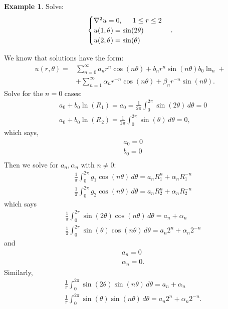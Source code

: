 \documentclass{book}
\theoremstyle{definition}
\newtheorem{exmp}{Example}[section]
\newcommand{\f}[2]{\frac{#1}{#2}}
\begin{document}
\begin{exmp}
	Solve:
	\begin{align*}
	\begin{cases}
	\laplacian u = 0, \hspace{0.5cm} 1\leq r\leq 2\\
	u(1,\theta) = \sin(2\theta)\\
	u(2,\theta) = \sin(\theta)
	\end{cases}.
	\end{align*}
	
	We know that solutions have the form:
	\begin{align*}
	u(r,\theta) =& \sum^\infty_{n=0} a_n r^n \cos(n\theta) + b_n r^{n}\sin(n\theta) b_0\ln_n +\\
	&+\sum^\infty_{n=1}\alpha_n r^{-n}\cos(n\theta) + \beta_n r^{-n}\sin(n\theta). 
	\end{align*}
	Solve for the $n=0$ cases:
	\begin{align*}
	&a_0 + b_0 \ln(R_1) = a_0 = \f{1}{2\pi}\int^{2\pi}_0 \sin(2\theta)\,d\theta = 0\\
	&a_0 + b_0 \ln(R_2) = \f{1}{2\pi}\int^{2\pi}_0 \sin(\theta)\,d\theta = 0,
	\end{align*}
	which says,
	\begin{align*}
	&a_0 = 0\\
	&b_0 = 0\\
	\end{align*}
	Then we solve for $a_n, \alpha_n$ with $n\neq 0$:
	\begin{align*}
	&\f{1}{\pi}\int^{2\pi}_0 g_1\cos(n\theta)\,d\theta = a_n R_1^n + \alpha_n R_1^{-n}\\
	&\f{1}{\pi}\int^{2\pi}_0 g_2\cos(n\theta)\,d\theta = a_n R_2^n + \alpha_n R_2^{-n}
	\end{align*}
	which says
	\begin{align*}
	&\f{1}{\pi}\int^{2\pi}_0 \sin(2\theta)\cos(n\theta)\,d\theta = a_n + \alpha_n\\
	&\f{1}{\pi}\int^{2\pi}_0 \sin(\theta)\cos(n\theta)\,d\theta = a_n 2^n + \alpha_n 2^{-n}
	\end{align*}
	and
	\begin{align*}
	&a_n = 0\\
	&\alpha_n = 0.
	\end{align*}
	Similarly, 
	\begin{align*}
	&\f{1}{\pi}\int^{2\pi}_0 \sin(2\theta)\sin(n\theta)\,d\theta = a_n + \alpha_n\\
	&\f{1}{\pi}\int^{2\pi}_0 \sin(\theta)\sin(n\theta)\,d\theta = a_n 2^n + \alpha_n 2^{-n}.

\end{align*}
\end{exmp}
\end{document}
